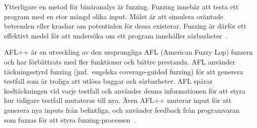Ytterligare en metod för binäranalys är fuzzing. Fuzzing innebär att testa ett
program med en stor mängd olika input. Målet är att simulera oväntade beteenden
eller krashar om potentialen för dessa existerar. Fuzzing är därför ett
effektivt medel för att undersöka om ett program innehåller
sårbarheter~\cite{rawat}.

AFL++ är en utveckling av den ursprungliga AFL (American Fuzzy Lop) fuzzern och
har förbättrats med fler funktioner och bättre prestanda. AFL använder
täckningsstyrd fuzzing (jmf.\ engelska coverage-guided fuzzing) för att generera
testfall som är troliga att utlösa buggar och sårbarheter. AFL spårar
kodtäckningen vid varje testfall och använder denna informationen för att styra
hur tidigare testfall mutateras till nya. Även AFL++ muterar input för att
generera nya inputs från befintliga, och använder feedback från programvaran som
fuzzas för att styra fuzzing-processen~\cite{aflplusplus}.
